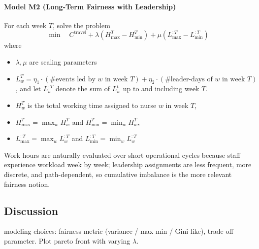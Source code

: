 \paragraph{Model M2 (Long-Term Fairness with Leadership)}
For each week $T$, solve the problem
\begin{equation}
\min \quad 
C^{\text{travel}} 
+ \lambda (H^T_{\max}- H^T_{\min})
+ \mu (L^{:T}_{\max}- L^{:T}_{\min})
\end{equation}
where 
\begin{itemize}
    \item $\lambda, \mu$ are scaling parameters
    \item $L_w^T = \eta_1 \cdot (\text{\# events led by } w \text{ in week } T)
+ \eta_2 \cdot (\text{\# leader-days of } w \text{ in week } T)$, and let $L_w^{:T}$ denote the sum of $L_w^t$ up to and including week $T$. 
	\item $H_w^T$ is the total working time assigned to nurse $w$ in week $T$,
	\item $H_{\max}^T=\max_w H_w^T$ and $H_{\min}^T=\min_w H_w^T$,

	\item $L_{\max}^{:T}=\max_w L_w^{:T}$ and $L_{\min}^{:T}=\min_w L_w^{:T}$
\end{itemize}

Work hours are naturally evaluated over short operational cycles because staff experience workload week by week; leadership assignments are less frequent, more discrete, and path-dependent, so cumulative imbalance is the more relevant fairness notion.


\subsection{Discussion}
modeling choices: fairness metric (variance / max-min / Gini-like), trade-off parameter. Plot pareto front with varying $\lambda$.